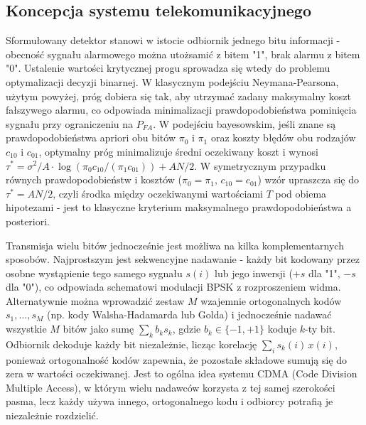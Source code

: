 \documentclass[12pt,a4paper]{article}
\begin{document}
\subsection{Koncepcja systemu telekomunikacyjnego}

Sformułowany detektor stanowi w istocie odbiornik jednego bitu informacji - obecność sygnału alarmowego można utożsamić z bitem "1", brak alarmu z bitem "0". Ustalenie wartości krytycznej progu sprowadza się wtedy do problemu optymalizacji decyzji binarnej. W klasycznym podejściu Neymana-Pearsona, użytym powyżej, próg dobiera się tak, aby utrzymać zadany maksymalny koszt fałszywego alarmu, co odpowiada minimalizacji prawdopodobieństwa pominięcia sygnału przy ograniczeniu na $P_{FA}$. W podejściu bayesowskim, jeśli znane są prawdopodobieństwa apriori obu bitów $\pi_0$ i $\pi_1$ oraz koszty błędów obu rodzajów $c_{10}$ i $c_{01}$, optymalny próg minimalizuje średni oczekiwany koszt i wynosi $\tau^* = \sigma^2 / A \cdot \log\!\left(\pi_0 c_{10} / (\pi_1 c_{01})\right) + AN/2$. W symetrycznym przypadku równych prawdopodobieństw i kosztów ($\pi_0 = \pi_1$, $c_{10} = c_{01}$) wzór upraszcza się do $\tau^* = AN/2$, czyli środka między oczekiwanymi wartościami $T$ pod obiema hipotezami - jest to klasyczne kryterium maksymalnego prawdopodobieństwa a posteriori.

Transmisja wielu bitów jednocześnie jest możliwa na kilka komplementarnych sposobów. Najprostszym jest sekwencyjne nadawanie - każdy bit kodowany przez osobne wystąpienie tego samego sygnału $s(i)$ lub jego inwersji ($+s$ dla "1", $-s$ dla "0"), co odpowiada schematowi modulacji BPSK z rozproszeniem widma. Alternatywnie można wprowadzić zestaw $M$ wzajemnie ortogonalnych kodów $s_1, \dots, s_M$ (np. kody Walsha-Hadamarda lub Golda) i jednocześnie nadawać wszystkie $M$ bitów jako sumę $\sum_k b_k s_k$, gdzie $b_k \in \{-1, +1\}$ koduje $k$-ty bit. Odbiornik dekoduje każdy bit niezależnie, licząc korelację $\sum_i s_k(i)\,x(i)$, ponieważ ortogonalność kodów zapewnia, że pozostałe składowe sumują się do zera w wartości oczekiwanej. Jest to ogólna idea systemu CDMA (Code Division Multiple Access), w którym wielu nadawców korzysta z tej samej szerokości pasma, lecz każdy używa innego, ortogonalnego kodu i odbiorcy potrafią je niezależnie rozdzielić.
\end{document}
